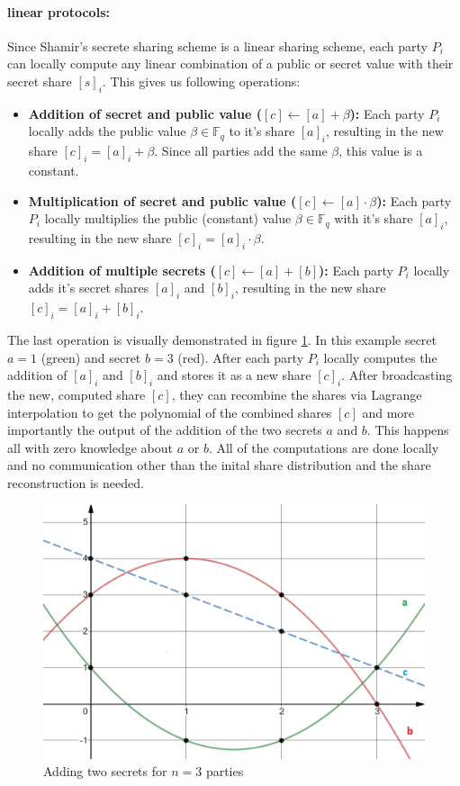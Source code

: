 \paragraph{linear protocols:}
Since Shamir's secrete sharing scheme is a linear sharing scheme, each party $P_i$ can locally compute any linear combination of a public or secret value with their secret share $[s]_i$. This gives us following operations:
\begin{itemize}
  \item \textbf{Addition of secret and public value ($[c] \gets [a] + \beta$):} Each party $P_i$ locally adds the public value $\beta \in \mathbb{F}_q$ to it's share $[a]_i$, resulting in the new share $[c]_i = [a]_i + \beta$. Since all parties add the same $\beta$, this value is a constant.
  \item \textbf{Multiplication of secret and public value ($[c] \gets [a] \cdot \beta$):} Each party $P_i$ locally multiplies the public (constant) value $\beta \in \mathbb{F}_q$ with it's share $[a]_i$, resulting in the new share $[c]_i = [a]_i \cdot \beta$.
  \item \textbf{Addition of multiple secrets ($[c] \gets [a] + [b]$):} Each party $P_i$ locally adds it's secret shares $[a]_i$ and $[b]_i$, resulting in the new share $[c]_i = [a]_i + [b]_i$.
\end{itemize}

The last operation is visually demonstrated in figure \ref{fig:addsecrets}. In this example secret $a=1$ (green) and secret $b=3$ (red). After each party $P_i$ locally computes the addition of $[a]_i$ and $[b]_i$ and stores it as a new share $[c]_i$. After broadcasting the new, computed share $[c]$, they can recombine the shares via Lagrange interpolation to get the polynomial of the combined shares $[c]$ and more importantly the output of the addition of the two secrets $a$ and $b$. This happens all with zero knowledge about $a$ or $b$. All of the computations are done locally and no communication other than the inital share distribution and the share reconstruction is needed.

\begin{figure}
  \includegraphics[width=\linewidth]{plots/addsecrets.png}
  \caption{Adding two secrets for $n=3$ parties}
  \label{fig:addsecrets}
\end{figure}

